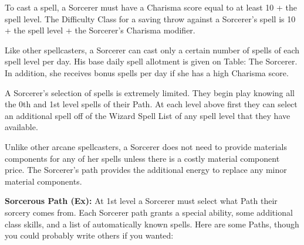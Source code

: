 To cast a spell, a Sorcerer must have a Charisma score equal to at least 10 + the spell level. The Difficulty Class for a saving throw against a Sorcerer's spell is 10 + the spell level + the Sorcerer's Charisma modifier.

Like other spellcasters, a Sorcerer can cast only a certain number of spells of each spell level per day. His base daily spell allotment is given on Table: The Sorcerer. In addition, she receives bonus spells per day if she has a high Charisma score.

A Sorcerer's selection of spells is extremely limited. They begin play knowing all the 0th and 1st level spells of their Path. At each level above first they can select an additional spell off of the Wizard Spell List of any spell level that they have available.

Unlike other arcane spellcasters, a Sorcerer does not need to provide materials components for any of her spells unless there is a costly material component price. The Sorcerer's path provides the additional energy to replace any minor material components.

\textbf{Sorcerous Path (Ex):} At 1st level a Sorcerer must select what Path their sorcery comes from. Each Sorcerer path grants a special ability, some additional class skills, and a list of automatically known spells. Here are some Paths, though you could probably write others if you wanted:

